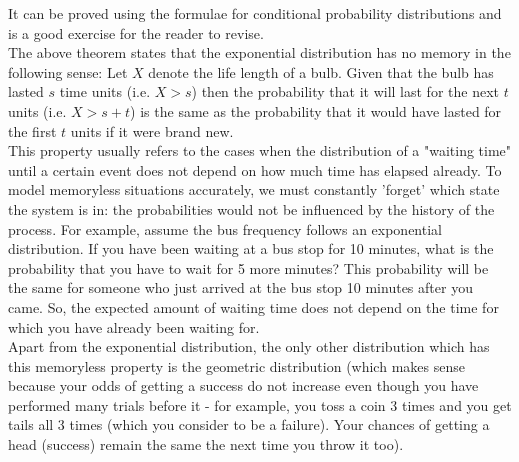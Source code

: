 It can be proved using the formulae for conditional probability distributions and is a good exercise for the reader to revise. \\
The above theorem states that the exponential distribution has no memory in the following sense: Let $X$ denote the life length of a bulb. Given that the bulb has lasted $s$ time units (i.e. $X > s$) then the probability that it will last for the next $t$ units (i.e. $X > s + t$) is the same as the probability that it would have lasted for the first $t$ units if it were brand new.\\
This property usually refers to the cases when the distribution of a "waiting time" until a certain event does not depend on how much time has elapsed already. To model memoryless situations accurately, we must constantly 'forget' which state the system is in: the probabilities would not be influenced by the history of the process. For example, assume the bus frequency follows an exponential distribution. If you have been waiting at a bus stop for 10 minutes, what is the probability that you have to wait for 5 more minutes? This probability will be the same for someone who just arrived at the bus stop 10 minutes after you came. So, the expected amount of waiting time does not depend on the time for which you have already been waiting for. \\ Apart from the exponential distribution, the only other distribution which has this memoryless property is the geometric distribution (which makes sense because your odds of getting a success do not increase even though you have performed many trials before it - for example, you toss a coin 3 times and you get tails all 3 times (which you consider to be a failure). Your chances of getting a head (success) remain the same the next time you throw it too).

